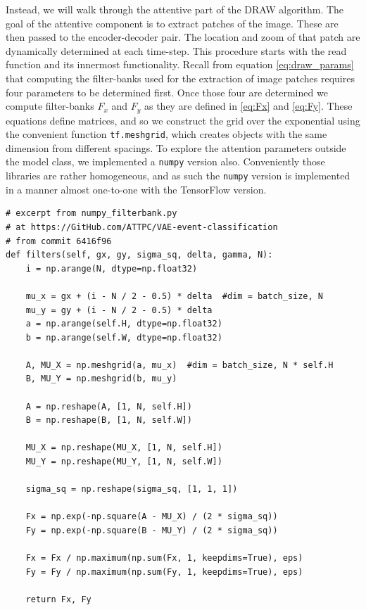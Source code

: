Instead, we will walk through the attentive part of the DRAW algorithm. The goal of the attentive component is to extract patches of the image. These are then passed to the encoder-decoder pair. The location and zoom of that patch are dynamically determined at each time-step. This procedure starts with the read function and its innermost functionality. Recall from equation \ref{eq:draw_params}  that computing the filter-banks used for the extraction of image patches requires four parameters to be determined first. Once those four are determined we compute filter-banks $F_x$ and $F_y$ as they are defined in \ref{eq:Fx} and \ref{eq:Fy}. These equations define matrices, and so we construct the grid over the exponential using the convenient function \lstinline{tf.meshgrid}, which creates objects with the same dimension from different spacings. To explore the attention parameters outside the model class, we implemented a \lstinline{numpy} version also. Conveniently those libraries are rather homogeneous, and as such the \lstinline{numpy} version is implemented in a manner almost one-to-one with the TensorFlow version. 


\begin{minipage}{\linewidth}
\begin{lstlisting}[language=iPython]
# excerpt from numpy_filterbank.py
# at https://GitHub.com/ATTPC/VAE-event-classification
# from commit 6416f96
def filters(self, gx, gy, sigma_sq, delta, gamma, N):
    i = np.arange(N, dtype=np.float32)

    mu_x = gx + (i - N / 2 - 0.5) * delta  #dim = batch_size, N
    mu_y = gy + (i - N / 2 - 0.5) * delta
    a = np.arange(self.H, dtype=np.float32)
    b = np.arange(self.W, dtype=np.float32)

    A, MU_X = np.meshgrid(a, mu_x)  #dim = batch_size, N * self.H
    B, MU_Y = np.meshgrid(b, mu_y)

    A = np.reshape(A, [1, N, self.H])
    B = np.reshape(B, [1, N, self.W])

    MU_X = np.reshape(MU_X, [1, N, self.H])
    MU_Y = np.reshape(MU_Y, [1, N, self.W])

    sigma_sq = np.reshape(sigma_sq, [1, 1, 1])

    Fx = np.exp(-np.square(A - MU_X) / (2 * sigma_sq))
    Fy = np.exp(-np.square(B - MU_Y) / (2 * sigma_sq))

    Fx = Fx / np.maximum(np.sum(Fx, 1, keepdims=True), eps)
    Fy = Fy / np.maximum(np.sum(Fy, 1, keepdims=True), eps)

    return Fx, Fy
\end{lstlisting}
\end{minipage}

